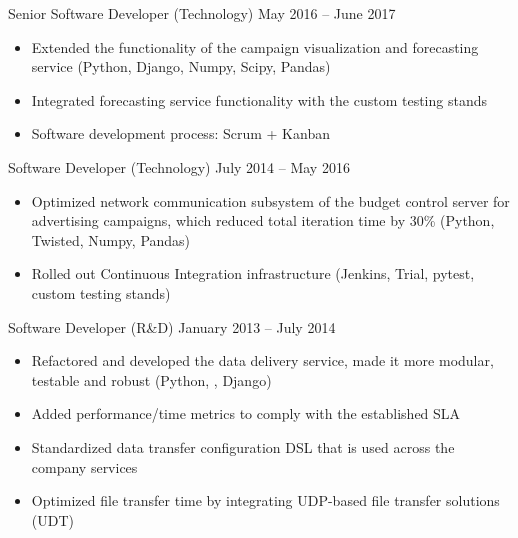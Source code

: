 \documentclass[unicode, 10pt, a4paper, oneside, fleqn]{article}
\begin{document}
{            {Senior Software Developer (Technology)}
            {May 2016 -- June 2017}
            {
                \begin{itemize}
                    \item{Extended the functionality of the campaign visualization and
                          forecasting service (Python, Django, Numpy, Scipy, Pandas)}
                    \item{Integrated forecasting service functionality with the
                          custom testing stands}
                    \item{Software development process: Scrum + Kanban}
                \end{itemize}
            }
        \position  %
            {Software Developer (Technology)}
            {July 2014 -- May 2016}
            {
                \begin{itemize}
                    \item{Optimized network communication subsystem of the
                          budget control server for advertising campaigns, which
                          reduced total iteration time by 30\% (Python, Twisted, Numpy, Pandas)}
                    \item{Rolled out Continuous Integration infrastructure
                          (Jenkins, Trial, pytest, custom testing stands)}
                \end{itemize}
            }
        \position  %
            {Software Developer (R\&D)}
            {January 2013 -- July 2014}
            {
                \begin{itemize}
                    \item{Refactored and developed the data delivery service,
                          made it more modular, testable and robust
                          (Python, , Django)}
                    \item{Added performance/time metrics to comply with the established
                          SLA}
                    \item{Standardized data transfer configuration DSL that
                          is used across the company services}
                    \item{Optimized file transfer time by integrating UDP-based
                          file transfer solutions (UDT)}
                \end{itemize}
            }
    }
\end{document}
